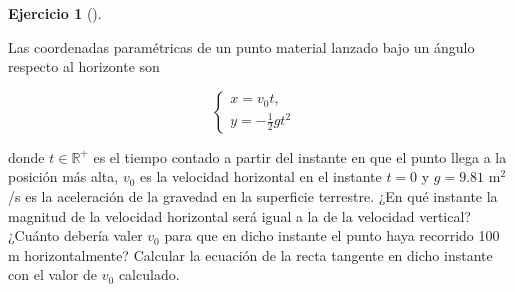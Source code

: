 \documentclass[
  a4paper,
]{scrreport}
\theoremstyle{definition}
\newtheorem{exercise}{Ejercicio}[chapter]
\theoremstyle{remark}
\begin{document}
\begin{exercise}[]\protect\hypertarget{exr-trayectorias-2}{}\label{exr-trayectorias-2}

Las coordenadas paramétricas de un punto material lanzado bajo un ángulo
respecto al horizonte son

\[
\begin{cases}
x=v_0t, & \\
y=-\frac{1}{2}gt^2
\end{cases}
\]

donde \(t\in \mathbb{R}^{+}\) es el tiempo contado a partir del instante
en que el punto llega a la posición más alta, \(v_0\) es la velocidad
horizontal en el instante \(t=0\) y \(g=9.81\) m\(^2\)/s es la
aceleración de la gravedad en la superficie terrestre. ¿En qué instante
la magnitud de la velocidad horizontal será igual a la de la velocidad
vertical? ¿Cuánto debería valer \(v_0\) para que en dicho instante el
punto haya recorrido 100 m horizontalmente? Calcular la ecuación de la
recta tangente en dicho instante con el valor de \(v_0\) calculado.

\end{exercise}
\end{document}
